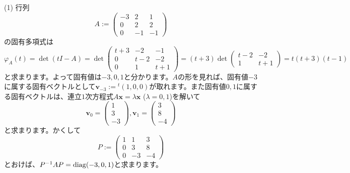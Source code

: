 \noindent (1) 行列
\[
A :=
\begin{pmatrix}
-3 & 2 & 1 \\
0 & 2 & 2 \\
0 & -1 & -1
\end{pmatrix}
\]
の固有多項式は
\[
\varphi_A(t) = \det(tI - A) =
\det
\begin{pmatrix}
t + 3 & -2 & -1 \\
0 & t - 2 & -2 \\
0 & 1 & t + 1
\end{pmatrix}
=
(t + 3)
\det
\begin{pmatrix}
t - 2 & -2 \\
1 & t + 1
\end{pmatrix}
= t(t + 3)(t - 1)
\]
と求まります。よって固有値は$-3, 0, 1$と分かります。$A$の形を見れば、固有値$-3$に属する固有ベクトルとして$\bm{v}_{-3} := {}^t(1, 0, 0)$が取れます。また固有値$0, 1$に属する固有ベクトルは、連立$1$次方程式$A\bm{x} = \lambda\bm{x}$ ($\lambda = 0, 1$)を解いて
\[
\bm{v}_0 =
\begin{pmatrix}
1 \\
3 \\
-3
\end{pmatrix}, 
\bm{v}_1 = 
\begin{pmatrix}
3 \\
8 \\
-4
\end{pmatrix}
\]
と求まります。かくして
\[
P:= 
\begin{pmatrix}
1 & 1 & 3 \\
0 & 3 & 8 \\
0 & -3 & -4
\end{pmatrix}
\]
とおけば、$P^{-1} A P = \operatorname{diag}(-3, 0, 1)$と求まります。

